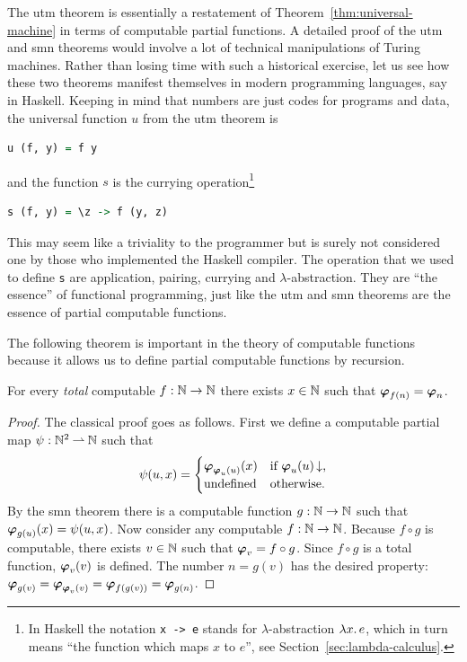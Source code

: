 \noindent
The utm theorem is essentially a restatement of
Theorem~\ref{thm:universal-machine} in terms of computable partial
functions. A detailed proof of the utm and smn theorems would involve
a lot of technical manipulations of Turing machines. Rather than
losing time with such a historical exercise, let us see how these two
theorems manifest themselves in modern programming languages, say in
Haskell. Keeping in mind that numbers are just codes for programs and
data, the universal function $u$ from the utm theorem is
%
\begin{lstlisting}[language=Haskell]
u (f, y) = f y
\end{lstlisting}
%
and the function $s$ is the currying operation\footnote{In Haskell the
  notation \texttt{{}x -> e} stands for $\lambda$-abstraction
  $\lambda x .\,e$, which in turn means ``the function which maps $x$ to
  $e$'', see Section~\ref{sec:lambda-calculus}.}
%
\begin{lstlisting}[language=Haskell]
s (f, y) = \z -> f (y, z)
\end{lstlisting}
%
This may seem like a triviality to the programmer but is surely not
considered one by those who implemented the Haskell compiler. The
operation that we used to define \lstinline!s! are application,
pairing, currying and $\lambda$-abstraction. They are ``the essence''
of functional programming, just like the utm and smn theorems are the
essence of partial computable functions.

The following theorem is important in the theory of computable
functions because it allows us to define partial computable functions
by recursion.

\begin{theorem}
  For every \emph{total} computable $f : \mathbb{N} \to \mathbb{N}$ there exists $x
  \in \mathbb{N}$ such that $\text{\boldmath{$\varphi$}}_{f(n)} = \text{\boldmath{$\varphi$}}_{n}$.
\end{theorem}

\begin{proof}
  The classical proof goes as follows. First we define a computable
  partial map $\psi : \mathbb{N}^2 \mathbin{\rightharpoonup} \mathbb{N}$ such that
  \begin{equation*}
    \psi(u, x) =
    \begin{cases}
      \text{\boldmath{$\varphi$}}_{\text{\boldmath{$\varphi$}}_{u}(u)}(x) & \text{if $\text{\boldmath{$\varphi$}}_{u}(u)\,{\downarrow}$,}\\
      \text{undefined}  & \text{otherwise.}\\
    \end{cases}
  \end{equation*}
  By the smn theorem there is a computable function $g : \mathbb{N} \to \mathbb{N}$
  such that $\text{\boldmath{$\varphi$}}_{g(u)}(x) = \psi(u, x)$. Now consider any computable
  $f : \mathbb{N} \to \mathbb{N}$. Because $f \circ g$ is computable, there exists
  $v \in \mathbb{N}$ such that $\text{\boldmath{$\varphi$}}_{v} = f \circ g$. Since $f \circ g$ is a
  total function, $\text{\boldmath{$\varphi$}}_{v}(v)$ is defined. The number $n = g(v)$ has
  the desired property:
  $\text{\boldmath{$\varphi$}}_{g(v)} = \text{\boldmath{$\varphi$}}_{\text{\boldmath{$\varphi$}}_{v}(v)} = \text{\boldmath{$\varphi$}}_{f(g(v))} = \text{\boldmath{$\varphi$}}_{g(n)}$.
\end{proof}


